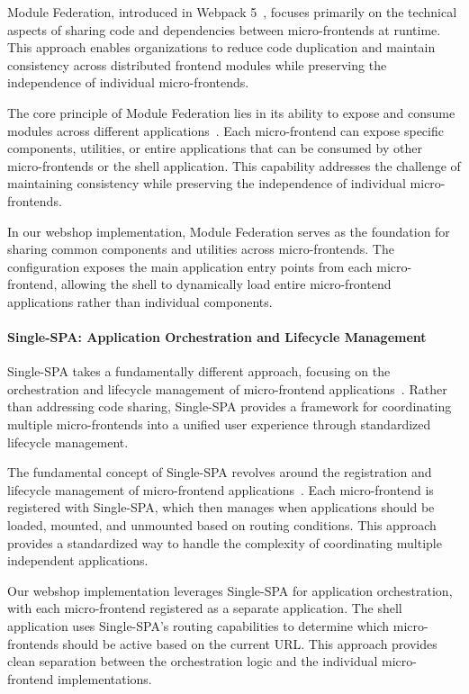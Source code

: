 \documentclass[12pt,a4paper]{report}
\begin{document}
Module Federation, introduced in Webpack 5~\cite{webpack-module-federation}, focuses primarily on the technical aspects of sharing code and dependencies between micro-frontends at runtime. This approach enables organizations to reduce code duplication and maintain consistency across distributed frontend modules while preserving the independence of individual micro-frontends.

The core principle of Module Federation lies in its ability to expose and consume modules across different applications~\cite{zack2020module-federation}. Each micro-frontend can expose specific components, utilities, or entire applications that can be consumed by other micro-frontends or the shell application. This capability addresses the challenge of maintaining consistency while preserving the independence of individual micro-frontends.

In our webshop implementation, Module Federation serves as the foundation for sharing common components and utilities across micro-frontends. The configuration exposes the main application entry points from each micro-frontend, allowing the shell to dynamically load entire micro-frontend applications rather than individual components.

\paragraph{Single-SPA: Application Orchestration and Lifecycle Management}

Single-SPA takes a fundamentally different approach, focusing on the orchestration and lifecycle management of micro-frontend applications~\cite{single-spa-docs}. Rather than addressing code sharing, Single-SPA provides a framework for coordinating multiple micro-frontends into a unified user experience through standardized lifecycle management.

The fundamental concept of Single-SPA revolves around the registration and lifecycle management of micro-frontend applications~\cite{canter2020single-spa}. Each micro-frontend is registered with Single-SPA, which then manages when applications should be loaded, mounted, and unmounted based on routing conditions. This approach provides a standardized way to handle the complexity of coordinating multiple independent applications.

Our webshop implementation leverages Single-SPA for application orchestration, with each micro-frontend registered as a separate application. The shell application uses Single-SPA's routing capabilities to determine which micro-frontends should be active based on the current URL. This approach provides clean separation between the orchestration logic and the individual micro-frontend implementations.
\end{document}
